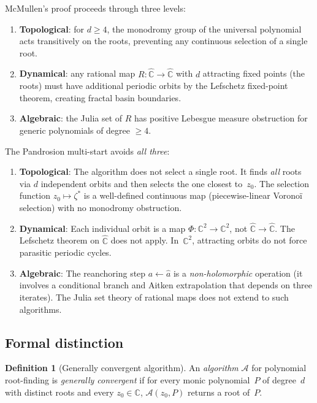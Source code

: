 \documentclass[11pt,a4paper]{article}
\theoremstyle{definition}
\newtheorem{definition}[theorem]{Definition}
\theoremstyle{remark}
\begin{document}
McMullen's proof proceeds through three levels:

\begin{enumerate}
\item \textbf{Topological}: for $d \geq 4$, the monodromy group of the universal polynomial acts transitively on the roots, preventing any continuous selection of a single root.
\item \textbf{Dynamical}: any rational map $R: \hat{\mathbb{C}} \to \hat{\mathbb{C}}$ with $d$ attracting fixed points (the roots) must have additional periodic orbits by the Lefschetz fixed-point theorem, creating fractal basin boundaries.
\item \textbf{Algebraic}: the Julia set of $R$ has positive Lebesgue measure obstruction for generic polynomials of degree $\geq 4$.
\end{enumerate}

The Pandrosion multi-start avoids \emph{all three}:

\begin{enumerate}
\item \textbf{Topological}: The algorithm does not select a single root.  It finds \emph{all} roots via $d$ independent orbits and then selects the one closest to~$z_0$.  The selection function $z_0 \mapsto \zeta^*$ is a well-defined continuous map (piecewise-linear Vorono\"i selection) with no monodromy obstruction.

\item \textbf{Dynamical}: Each individual orbit is a map $\Phi: \mathbb{C}^2 \to \mathbb{C}^2$, not $\hat{\mathbb{C}} \to \hat{\mathbb{C}}$.  The Lefschetz theorem on $\hat{\mathbb{C}}$ does not apply.  In~$\mathbb{C}^2$, attracting orbits do not force parasitic periodic cycles.

\item \textbf{Algebraic}: The reanchoring step $a \leftarrow \hat{a}$ is a \emph{non-holomorphic} operation (it involves a conditional branch and Aitken extrapolation that depends on three iterates).  The Julia set theory of rational maps does not extend to such algorithms.
\end{enumerate}

\subsection{Formal distinction}

\begin{definition}[Generally convergent algorithm]
\label{def:gen_conv}
An \emph{algorithm} $\mathcal{A}$ for polynomial root-finding is \emph{generally convergent} if for every monic polynomial~$P$ of degree~$d$ with distinct roots and every $z_0 \in \mathbb{C}$, $\mathcal{A}(z_0, P)$ returns a root of~$P$.
\end{definition}
\end{document}

